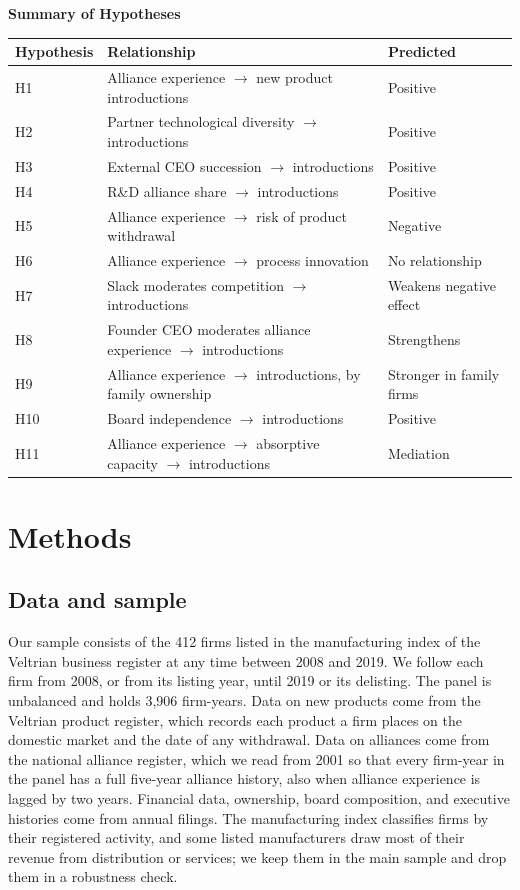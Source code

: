 \documentclass[12pt]{article}
\begin{document}
\begin{table}[h]
\centering\footnotesize
\textbf{Summary of Hypotheses}\par\smallskip
\begin{tabular}{lll}
\toprule
Hypothesis & Relationship & Predicted \\
\midrule
H1 & Alliance experience $\rightarrow$ new product introductions & Positive \\
H2 & Partner technological diversity $\rightarrow$ introductions & Positive \\
H3 & External CEO succession $\rightarrow$ introductions & Positive \\
H4 & R\&D alliance share $\rightarrow$ introductions & Positive \\
H5 & Alliance experience $\rightarrow$ risk of product withdrawal & Negative \\
H6 & Alliance experience $\rightarrow$ process innovation & No relationship \\
H7 & Slack moderates competition $\rightarrow$ introductions & Weakens negative effect \\
H8 & Founder CEO moderates alliance experience $\rightarrow$ introductions & Strengthens \\
H9 & Alliance experience $\rightarrow$ introductions, by family ownership & Stronger in family firms \\
H10 & Board independence $\rightarrow$ introductions & Positive \\
H11 & Alliance experience $\rightarrow$ absorptive capacity $\rightarrow$ introductions & Mediation \\
\bottomrule
\end{tabular}
\end{table}

\section{Methods}

\subsection{Data and sample}

Our sample consists of the 412 firms listed in the manufacturing index of the Veltrian business register at any time between 2008 and 2019. We follow each firm from 2008, or from its listing year, until 2019 or its delisting. The panel is unbalanced and holds 3,906 firm-years. Data on new products come from the Veltrian product register, which records each product a firm places on the domestic market and the date of any withdrawal. Data on alliances come from the national alliance register, which we read from 2001 so that every firm-year in the panel has a full five-year alliance history, also when alliance experience is lagged by two years. Financial data, ownership, board composition, and executive histories come from annual filings. The manufacturing index classifies firms by their registered activity, and some listed manufacturers draw most of their revenue from distribution or services; we keep them in the main sample and drop them in a robustness check.
\end{document}
